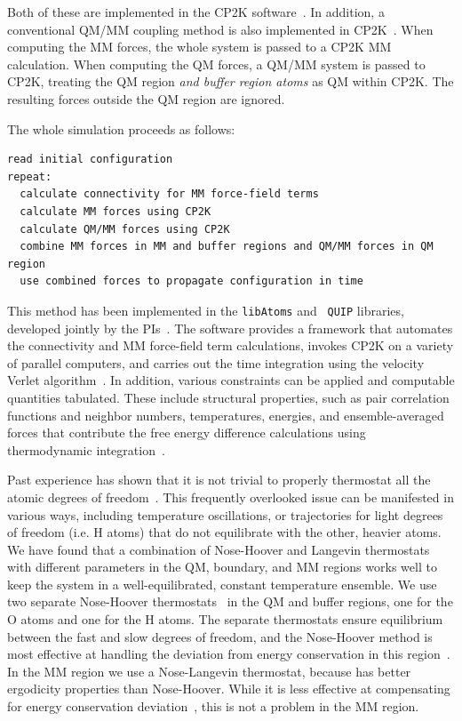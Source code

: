 \documentclass[11pt]{revtex4}
\begin{document}
Both of these are implemented in the CP2K
software~\cite{vandevondele_comp_phys_comm_2005a,laino_j_chem_theor_comp_2006a,cp2k_web}.
In addition, a conventional QM/MM coupling method is also implemented
in CP2K~\cite{laio_j_chem_phys_2002a}.  When computing the MM forces,
the whole system is passed to a CP2K MM calculation.  When computing
the QM forces, a QM/MM system is passed to CP2K, treating the QM
region {\em and buffer region atoms} as QM within CP2K.  The resulting
forces outside the QM region are ignored.

The whole simulation proceeds as follows:
\begin{verbatim}
read initial configuration
repeat:
  calculate connectivity for MM force-field terms
  calculate MM forces using CP2K
  calculate QM/MM forces using CP2K
  combine MM forces in MM and buffer regions and QM/MM forces in QM region
  use combined forces to propagate configuration in time
\end{verbatim}
This method has been implemented in the {\tt libAtoms} and {\tt
QUIP} libraries, developed jointly by the PIs~\cite{libatoms_web}.
The software provides a framework that automates the connectivity
and MM force-field term calculations, invokes CP2K on a variety of
parallel computers, and carries out the time integration using the
velocity Verlet algorithm~\cite{frenkel_2002a}.  In addition, various
constraints can be applied and computable quantities tabulated.
These include structural properties, such as pair correlation
functions and neighbor numbers, temperatures, energies, and
ensemble-averaged forces that contribute the free energy difference
calculations using thermodynamic integration~\cite{frenkel_2002b}.

Past experience has shown that it is not trivial to properly thermostat
all the atomic degrees of freedom~\cite{winfield_thesis_2009a}.
This frequently overlooked issue can be manifested in various ways,
including temperature oscillations, or trajectories for light degrees
of freedom (i.e. H atoms) that do not equilibrate with the other,
heavier atoms.  We have found that a combination of Nose-Hoover and
Langevin thermostats with different parameters in the QM, boundary,
and MM regions works well to keep the system in a well-equilibrated,
constant temperature ensemble.  We use two separate Nose-Hoover
thermostats~\cite{nose_mol_phys_1984a} in the QM and buffer regions,
one for the O atoms and one for the H atoms.  The separate thermostats
ensure equilibrium between the fast and slow degrees of freedom, and
the Nose-Hoover method is most effective at handling the deviation from
energy conservation in this region~\cite{winfield_thesis_2009a}.  In the
MM region we use a Nose-Langevin thermostat, because has better ergodicity
properties than Nose-Hoover.  While it is less effective at compensating
for energy conservation deviation~\cite{winfield_thesis_2009a}, this is
not a problem in the MM region.
\end{document}
